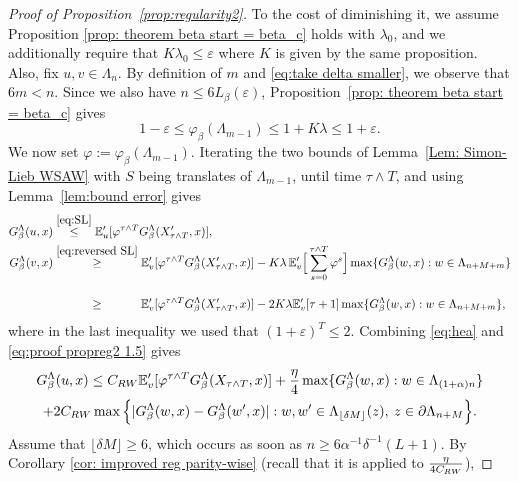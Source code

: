 \documentclass[11pt,a4paper]{article}
\numberwithin{equation}{section}
\theoremstyle{plain}
\theoremstyle{definition}
\begin{document}
\begin{proof}[Proof of Proposition~\textup{\ref{prop:regularity2}}]
To the cost of diminishing it, we assume Proposition \ref{prop: theorem beta start = beta_c} holds with $\lambda_0$, and we additionally require that $K\lambda_0\le \varepsilon$ where $K$ is given by the same proposition.
 Also, fix $u,v\in \Lambda_n$. By definition of $m$ and \eqref{eq:take delta smaller}, we observe that $6m<n$. Since we also have $n\le 6L_\beta(\varepsilon)$, Proposition~\ref{prop:  theorem beta start = beta_c} gives
\begin{equation}
1-\varepsilon\le \varphi_\beta(\Lambda_{m-1})\le 1+K\lambda\le 1+\varepsilon.
\end{equation}
We now set $\varphi:=\varphi_\beta(\Lambda_{m-1})$. Iterating the two bounds of Lemma~\ref{Lem: Simon-Lieb WSAW} with $S$ being translates of $\Lambda_{m-1}$, until time $\tau\wedge T$, and using Lemma~\ref{lem:bound error} gives
\begin{align}
G_\beta^\Lambda(u,x)&\stackrel{\eqref{eq:SL}}\le  \mathbb E_{u}'[\varphi^{\tau\wedge T} G_\beta^\Lambda(X_{\tau\wedge T}',x)],\label{eq:hea}\\
G_\beta^\Lambda(v,x)&\stackrel{\eqref{eq:reversed SL}}\ge \mathbb E_{v}'[\varphi^{\tau\wedge T} G_\beta^\Lambda(X_{\tau\wedge T}',x)]-K\lambda \,\mathbb E_v'\Big[\sum_{s=0}^{\tau\wedge T}\varphi^s\Big]\max\{G_\beta^\Lambda(w,x):w\in \Lambda_{n+M+m}\}\notag\\
&\stackrel{\phantom{\eqref{eq:reversed SL}}}\ge \mathbb E_v'[\varphi^{\tau\wedge T} G_\beta^\Lambda(X_{\tau\wedge T}',x)]-2K\lambda \mathbb E_v'[\tau+1]\max\{G_\beta^\Lambda(w,x):w\in \Lambda_{n+M+m}\}\label{eq:hda},
\end{align}
where in the last inequality we used that $(1+\varepsilon)^T\leq 2$.
Combining \eqref{eq:hea} and \eqref{eq:proof propreg2 1.5} gives
\begin{multline}\label{eq:proof propreg2 3}
	G_\beta^\Lambda(u,x)\leq C_{\rm RW}\mathbb E'_v[\varphi^{\tau\wedge T}G_\beta^{\Lambda}(X_{\tau\wedge T},x)]+\frac{\eta}{4}\max\{G_\beta^{\Lambda}(w,x):w\in \Lambda_{(1+\alpha)n}\}\\+2C_{\rm RW}\max \Big\{|G_\beta^\Lambda(w,x)-G_\beta^{\Lambda}(w',x)|: w,w'\in \Lambda_{\lfloor \delta M\rfloor}(z), \: z\in \partial \Lambda_{n+M}\Big\}. 
\end{multline}
Assume that $\lfloor\delta M\rfloor\geq 6$, which occurs as soon as $n\geq 6\alpha^{-1}\delta^{-1}(L+1)$. By Corollary \ref{cor: improved reg parity-wise} (recall that it is applied to $\tfrac{\eta}{4C_{\rm RW}}$),

\end{proof}
\end{document}
